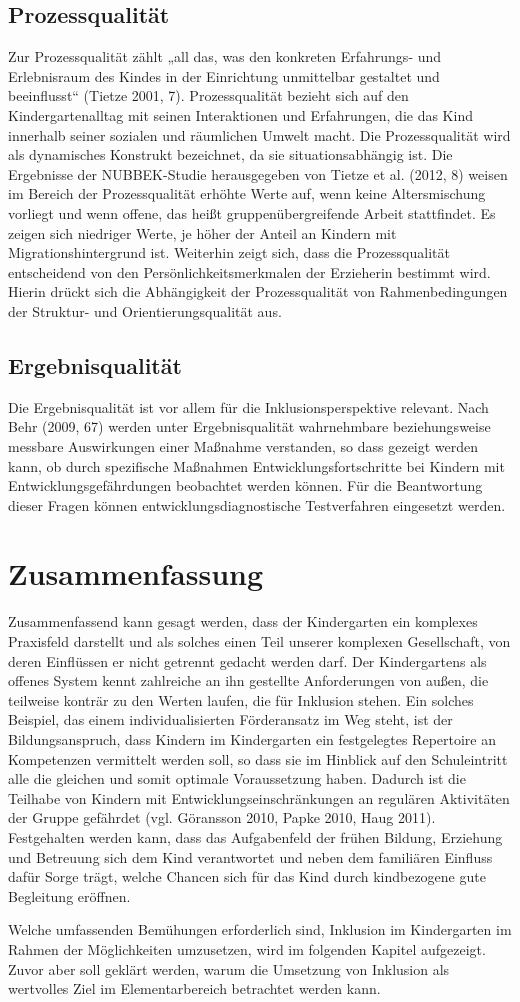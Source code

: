 \subsection{Prozessqualität}
Zur Prozessqualität zählt „all das, was den konkreten Erfahrungs- und Erlebnisraum des Kindes in der Einrichtung unmittelbar gestaltet und beeinflusst“ (Tietze 2001, 7). Prozessqualität bezieht sich auf den Kindergartenalltag mit seinen Interaktionen und Erfahrungen, die das Kind innerhalb seiner sozialen und räumlichen Umwelt macht. Die Prozessqualität wird als dynamisches Konstrukt bezeichnet, da sie situationsabhängig ist. Die Ergebnisse der NUBBEK-Studie herausgegeben von Tietze et al. (2012, 8) weisen im Bereich der Prozessqualität erhöhte Werte auf, wenn keine Altersmischung vorliegt und wenn offene, das heißt gruppenübergreifende Arbeit stattfindet. Es zeigen sich niedriger Werte, je höher der Anteil an Kindern mit Migrationshintergrund ist. Weiterhin zeigt sich, dass die Prozessqualität entscheidend von den Persönlichkeitsmerkmalen der Erzieherin bestimmt wird. Hierin drückt sich die Abhängigkeit der Prozessqualität von Rahmenbedingungen der Struktur- und Orientierungsqualität aus.   

\subsection{Ergebnisqualität}
Die Ergebnisqualität ist vor allem für die Inklusionsperspektive relevant. Nach Behr (2009, 67) werden unter Ergebnisqualität  wahrnehmbare beziehungsweise messbare Auswirkungen einer Maßnahme verstanden, so dass gezeigt werden kann, ob durch spezifische Maßnahmen Entwicklungsfortschritte bei Kindern mit Entwicklungsgefährdungen beobachtet werden können. Für die Beantwortung dieser Fragen können entwicklungsdiagnostische Testverfahren eingesetzt werden.


\section{Zusammenfassung}

Zusammenfassend kann gesagt werden, dass der Kindergarten ein komplexes Praxisfeld darstellt und als solches einen Teil unserer komplexen Gesellschaft, von deren Einflüssen er nicht getrennt gedacht werden darf. Der Kindergartens als offenes System kennt zahlreiche an ihn gestellte Anforderungen von außen, die teilweise konträr zu den Werten laufen, die für Inklusion stehen. 
Ein solches Beispiel, das einem individualisierten Förderansatz im Weg steht, ist der Bildungsanspruch, dass Kindern im Kindergarten ein festgelegtes Repertoire an Kompetenzen vermittelt werden soll, so dass sie im Hinblick auf den Schuleintritt alle die gleichen und somit optimale Voraussetzung haben. Dadurch ist die Teilhabe von Kindern mit Entwicklungseinschränkungen an regulären Aktivitäten der Gruppe gefährdet (vgl. Göransson 2010, Papke 2010, Haug 2011). Festgehalten werden kann, dass das Aufgabenfeld der frühen Bildung, Erziehung und Betreuung sich dem Kind verantwortet und neben dem familiären Einfluss dafür Sorge trägt, welche Chancen sich für das Kind durch kindbezogene gute Begleitung eröffnen.

Welche umfassenden Bemühungen erforderlich sind, Inklusion im Kindergarten im Rahmen der Möglichkeiten umzusetzen, wird im folgenden Kapitel aufgezeigt. Zuvor aber soll geklärt werden, warum die Umsetzung von Inklusion als wertvolles Ziel im Elementarbereich betrachtet werden kann.
